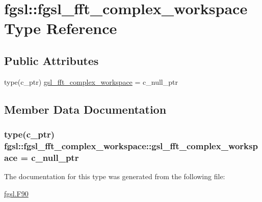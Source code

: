 \hypertarget{structfgsl_1_1fgsl__fft__complex__workspace}{}\section{fgsl\+:\+:fgsl\+\_\+fft\+\_\+complex\+\_\+workspace Type Reference}
\label{structfgsl_1_1fgsl__fft__complex__workspace}
\subsection*{Public Attributes}
\begin{DoxyCompactItemize}
\item 
type(c\+\_\+ptr) \hyperlink{structfgsl_1_1fgsl__fft__complex__workspace_abf8e2a8cf8e6a49c3098df94237f95e3}{gsl\+\_\+fft\+\_\+complex\+\_\+workspace} = c\+\_\+null\+\_\+ptr
\end{DoxyCompactItemize}


\subsection{Member Data Documentation}
\hypertarget{structfgsl_1_1fgsl__fft__complex__workspace_abf8e2a8cf8e6a49c3098df94237f95e3}{}
\subsubsection[{gsl\+\_\+fft\+\_\+complex\+\_\+workspace}]{\setlength{\rightskip}{0pt plus 5cm}type(c\+\_\+ptr) fgsl\+::fgsl\+\_\+fft\+\_\+complex\+\_\+workspace\+::gsl\+\_\+fft\+\_\+complex\+\_\+workspace = c\+\_\+null\+\_\+ptr}\label{structfgsl_1_1fgsl__fft__complex__workspace_abf8e2a8cf8e6a49c3098df94237f95e3}


The documentation for this type was generated from the following file\+:\begin{DoxyCompactItemize}
\item 
\hyperlink{fgsl_8F90}{fgsl.\+F90}\end{DoxyCompactItemize}
